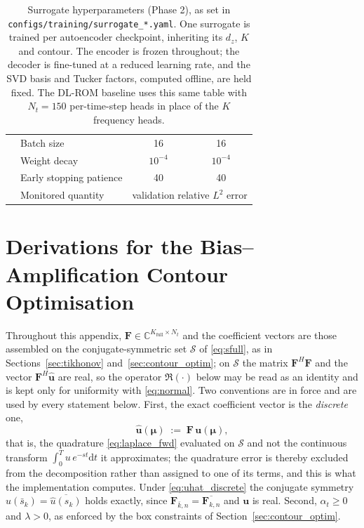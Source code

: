﻿\documentclass[a4paper,12pt]{article}
\theoremstyle{definition}
\theoremstyle{remark}
\newcommand{\C}{\mathbb{C}}
\newcommand{\vmu}{\bm{\mu}}
\begin{document}
\begin{table}[htbp]
\begin{tabular}{llcc}
          & Batch size                      & 16 & 16 \\
          & Weight decay                    & $10^{-4}$ & $10^{-4}$ \\
          & Early stopping patience         & 40 & 40 \\
          & Monitored quantity              & \multicolumn{2}{c}{validation relative $L^2$ error} \\
        \bottomrule
    \end{tabular}
    \caption{Surrogate hyperparameters (Phase 2), as set in \texttt{configs/training/surrogate\_*.yaml}. One surrogate is trained per autoencoder checkpoint, inheriting its $d_z$, $K$ and contour. The encoder is frozen throughout; the decoder is fine-tuned at a reduced learning rate, and the SVD basis and Tucker factors, computed offline, are held fixed. The DL-ROM baseline uses this same table with $N_t = 150$ per-time-step heads in place of the $K$ frequency heads.}
    \label{tab:surr_hparams}
\end{table}

\clearpage
\section{Derivations for the Bias--Amplification Contour Optimisation}
\label{app:bv_proof}

Throughout this appendix, $\bm{F} \in \C^{K_{\mathrm{full}} \times N_t}$ and the coefficient vectors are those assembled on the conjugate-symmetric set $\mathcal{S}$ of \eqref{eq:sfull}, as in Sections~\ref{sec:tikhonov} and~\ref{sec:contour_optim}; on $\mathcal{S}$ the matrix $\bm{F}^H\bm{F}$ and the vector $\bm{F}^H\hat{\bm{u}}$ are real, so the operator $\Re(\cdot)$ below may be read as an identity and is kept only for uniformity with \eqref{eq:normal}. Two conventions are in force and are used by every statement below. First, the exact coefficient vector is the \emph{discrete} one,
\begin{equation}
    \hat{\bm{u}}(\vmu) \;:=\; \bm{F}\,\bm{u}(\vmu),
    \label{eq:uhat_discrete}
\end{equation}
that is, the quadrature \eqref{eq:laplace_fwd} evaluated on $\mathcal{S}$ and not the continuous transform $\int_0^T u\,e^{-st}\mathrm{d}t$ it approximates; the quadrature error is thereby excluded from the decomposition rather than assigned to one of its terms, and this is what the implementation computes. Under \eqref{eq:uhat_discrete} the conjugate symmetry $\hat{u}(\bar s_k) = \overline{\hat u(s_k)}$ holds exactly, since $\bm{F}_{\bar k, n} = \overline{\bm{F}_{k,n}}$ and $\bm{u}$ is real. Second, $\alpha_t \ge 0$ and $\lambda > 0$, as enforced by the box constraints of Section~\ref{sec:contour_optim}.
\end{document}
